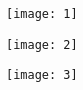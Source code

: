 \documentclass{article}
\begin{document}
\maketitle
\begin{figure}[h!]
	\centering
	\texttt{[image: 1]}
\end{figure}
\begin{figure}[h!]
	\centering
	\texttt{[image: 2]}
\end{figure}
\begin{figure}[h!]
	\centering
	\texttt{[image: 3]}
\end{figure}
\end{document}
